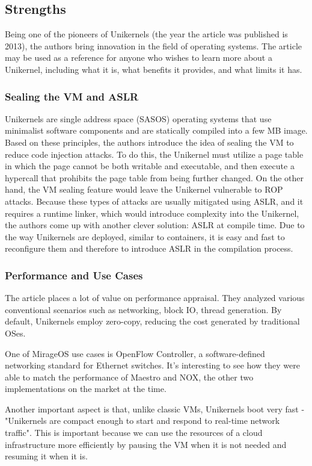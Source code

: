 \documentclass[12pt]{article}
\begin{document}
\subsection{Strengths}
Being one of the pioneers of Unikernels (the year the article was published is 2013), the authors bring innovation in the field of
operating systems.  The article may be used as a reference for anyone who wishes to learn more about a Unikernel, including what it is,
what benefits it provides, and what limits it has.

\subsubsection{Sealing the VM and ASLR}
Unikernels are single address space (SASOS) operating systems that use minimalist software components and are statically compiled into a
few MB image. Based on these principles, the authors introduce the idea of sealing the VM to reduce code injection attacks. To do this,
the Unikernel must utilize a page table in which the page cannot be both writable and executable, and then execute a hypercall that prohibits
the page table from being further changed. On the other hand, the VM sealing feature would leave the Unikernel vulnerable to ROP attacks.
Because these types of attacks are usually mitigated using ASLR, and it requires a runtime linker, which would introduce complexity into
the Unikernel, the authors come up with another clever solution: ASLR at compile time. Due to the way Unikernels are deployed, similar to
containers, it is easy and fast to reconfigure them and therefore to introduce  ASLR in the compilation process.

\subsubsection{Performance and Use Cases}
The article places a lot of value on performance appraisal. They analyzed various conventional scenarios such as networking, block IO,
thread generation. By default, Unikernels employ zero-copy, reducing the cost generated by traditional OSes. 

One of MirageOS use cases is OpenFlow Controller, a software-defined networking standard for Ethernet switches. It's interesting to see
how they were able to match the performance of Maestro and NOX, the other two implementations on the market at the time.

Another important aspect is that, unlike classic VMs, Unikernels boot very fast - "Unikernels are compact enough to start and respond to
real-time network traffic".  This is important because we can use the resources of a cloud infrastructure more efficiently by pausing the
VM when it is not needed and resuming it when it is.
\end{document}
